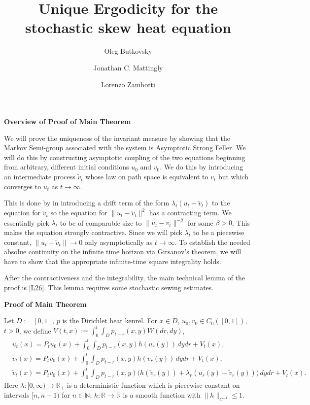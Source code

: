 \documentclass[12pt]{article}
\theoremstyle{definition}
\DeclareMathOperator{\1}{\mathbbm{1}}%
\renewcommand{\le}{\leqslant}
\newcommand{\wt}{\widetilde}
\newcommand{\N}{\mathbb{N}}
\newcommand{\R}{\mathbb{R}}
\begin{document}
	
\title{Unique Ergodicity for the stochastic skew heat equation}
	
	\author{
		Oleg Butkovsky%
		\and
		Jonathan C. Mattingly
		\and
		Lorenzo Zambotti
	}
	
	\maketitle

        \begin{center}
           \textbf{Overview of Proof of Main Theorem}  
        \end{center}
We will prove the uniqueness of the invariant measure by showing that
the Markov Semi-group associated with the system is Asymptotic Strong
Feller. We will do this by constructing asymptotic coupling of the two equations
beginning from arbitrary, different initial conditions $u_0$
and $v_0$. We do this by introducing an intermediate process $\wt
v_t$ whose law on path space is equivalent to $v_t$ but which
converges to $u_t$ as $t \rightarrow \infty$.

This is done by in
introducing a drift term of the form $\lambda_t(u_t-\wt v_t)$ to the
equation for $\wt v_t$ so the equation for $\|u_t - \wt v_t\|^2$ has a
contracting term. We essentially  pick $\lambda_t$ to be of comparable
size to $\|u_t - \wt v_t\|^{-\beta}$ for some $\beta>0$. This makes
the equation strongly contractive. Since we will pick $\lambda_t$ to
be a piecewise constant, $\|u_t - \wt v_t\| \rightarrow 0$ only
asymptotically as $t \rightarrow \infty$. To establish the needed
absolue continuity on the infinite time horizon via Girsanov's
theorem, we will have to show that the appropriate infinite-time square
integrality holds.

After the contractiveness and the integrability, the main technical
lemma of the proof is \cref{L26}. This lemma requires some 
stochastic sewing estimates.

        
        \newpage
        \begin{center}
        \textbf{Proof of Main Theorem}  
        \end{center}
Let $D:=[0,1]$, $p$ is the Dirichlet heat kenrel. For $x\in D$, $u_0,v_0\in C_0([0,1])$, $t>0$, we define $V(t,x):=\int_0^t \int_D p_{t-r}(x,y) W(dr,dy)$,
\begin{align}\label{spdeh}
&u_t(x)=P_t u_0(x) +\int_0^t\int_D p_{t-r}(x,y)
        h(u_r(y))\,dydr+V_t(x),\\
&v_t(x)=P_t v_0(x) +\int_0^t\int_D \label{spdehh}
        p_{t-r}(x,y) h(v_r(y))\,dydr+V_t(x),\\
&\wt v_t(x)=P_t
        v_0(x) +\int_0^t\int_D p_{t-r}(x,y) \bigl(h(\wt
        v_r(y))+\lambda_r(u_r(y)-\wt v_r(y))
        \bigr)\,dydr+V_t(x).\label{spdehhh}
\end{align}
Here $\lambda\colon[0,\infty)\to\R_+$ is a deterministic function which is piecewise constant on intervals $[n,n+ 1)$ for $n\in \N$; $h\colon\R\to\R$ is a smooth function with $\|h\|_{C^{-1}}\le 1$.	
\end{document}
